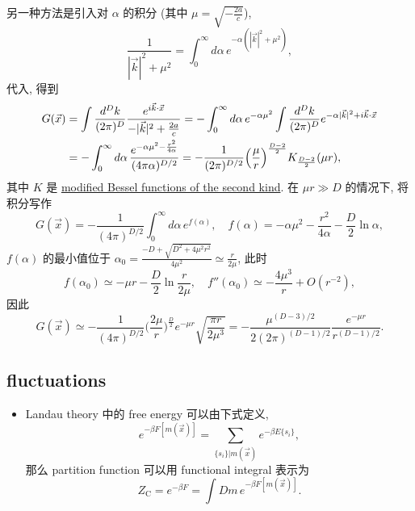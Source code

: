 \begin{itemize}
\begin{tcolorbox}[title=calculation:]
		另一种方法是引入对 $\alpha$ 的积分 (其中 $\mu = \sqrt{- \frac{2 a}{c}}$),
		\begin{equation}
			\frac{1}{|\vec{k}|^2 + \mu^2} = \int_0^\infty d\alpha \, e^{- \alpha (|\vec{k}|^2 + \mu^2)},
		\end{equation}
		代入, 得到
		\begin{align}
			G(\vec{x}) &= \int \frac{d^D k}{(2 \pi)^D} \frac{e^{i \vec{k} \cdot \vec{x}}}{- |\vec{k}|^2 + \frac{2 a}{c}} = - \int_0^\infty d\alpha \, e^{- \alpha \mu^2} \int \frac{d^D k}{(2 \pi)^D} e^{- \alpha |\vec{k}|^2 + i \vec{k} \cdot \vec{x}} \notag \\
			&= - \int_0^\infty d\alpha \, \frac{e^{- \alpha \mu^2 - \frac{r^2}{4 \alpha}}}{(4 \pi \alpha)^{D / 2}} = - \frac{1}{(2 \pi)^{D / 2}} \Big( \frac{\mu}{r} \Big)^{\frac{D - 2}{2}} K_{\frac{D - 2}{2}}(\mu r),
		\end{align}
		其中 $K$ 是 \href{https://en.wikipedia.org/wiki/Bessel_function#Modified_Bessel_functions:_I%CE%B1,_K%CE%B1}{modified Bessel functions of the second kind}. 在 $\mu r \gg D$ 的情况下, 将积分写作
		\begin{equation}
			G(\vec{x}) = - \frac{1}{(4 \pi)^{D / 2}} \int_0^\infty d\alpha \, e^{f(\alpha)}, \quad f(\alpha) = - \alpha \mu^2 - \frac{r^2}{4 \alpha} - \frac{D}{2} \ln \alpha,
		\end{equation} 
		$f(\alpha)$ 的最小值位于 $\alpha_0 = \frac{- D + \sqrt{D^2 + 4 \mu^2 r^2}}{4 \mu^2} \simeq \frac{r}{2 \mu}$, 此时
		\begin{equation}
			f(\alpha_0) \simeq - \mu r - \frac{D}{2} \ln \frac{r}{2 \mu}, \quad f''(\alpha_0) \simeq - \frac{4 \mu^3}{r} + O(r^{- 2}),
		\end{equation}
		因此
		\begin{equation}
			G(\vec{x}) \simeq - \frac{1}{(4 \pi)^{D / 2}} \Big( \frac{2 \mu}{r} \Big)^{\frac{D}{2}} e^{- \mu r} \sqrt{\frac{\pi r}{2 \mu^3}} = - \frac{\mu^{(D - 3) / 2}}{2 (2 \pi)^{(D - 1) / 2}} \frac{e^{- \mu r}}{r^{(D - 1) / 2}}.
		\end{equation}
	\end{tcolorbox}
\end{itemize}

\subsection{fluctuations}
\begin{itemize}
	\item Landau theory 中的 free energy 可以由下式定义,
	\begin{equation}
		e^{- \beta F[m(\vec{x})]} = \sum_{\{s_i\} | m(\vec{x})} e^{- \beta E\{s_i\}},
	\end{equation}
	那么 partition function 可以用 functional integral 表示为
	\begin{equation}
		Z_\text{C} = e^{- \beta F} = \int Dm \, e^{- \beta F[m(\vec{x})]}.
	\end{equation}
\end{itemize}
